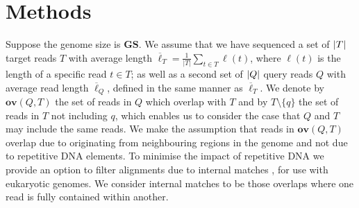 \documentclass[unnumsec,webpdf,modern,large]{oup-authoring-template}
\theoremstyle{thmstyleone}%
\theoremstyle{thmstyletwo}%
\theoremstyle{thmstylethree}%
\newcommand{\overl}[2]{\mathbf{ov}(#1, #2)}
\DeclarePairedDelimiter\size{\lvert}{\rvert}
\newcommand{\gs}{\textbf{GS}}
\begin{document}

\section{Methods}

Suppose the genome size is $\gs$. We assume that we have sequenced a set of $\size{T}$ target reads $T$ with average length $\overline{\ell}_T = \frac{1}{|T|} \sum_{t \in T} \ell(t)$, where $\ell(t)$ is the length of a specific read $t \in T$; as well as a second set of $\size{Q}$ query reads $Q$ with average read length $\overline{\ell}_Q$, defined in the same manner as $\overline{\ell}_T$.  We denote by $\overl{Q}{T}$ the set of reads in $Q$ which overlap with $T$ and by $T \setminus \{q\}$ the set of reads in $T$ not including $q$, which enables us to consider the case that $Q$ and $T$ may include the same reads.  We make the assumption that reads in $\overl{Q}{T}$  overlap due to originating from neighbouring regions in the genome and not due to repetitive DNA elements. To minimise the impact of repetitive DNA we provide an option to filter alignments due to internal matches \citep{li2016minimap}, for use with eukaryotic genomes. We consider internal matches to be those overlaps where one read is fully contained within another.
\end{document}
